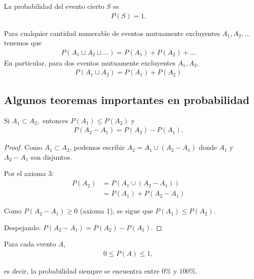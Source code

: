 \begin{axioma}
	La probabilidad del evento cierto $S$ es
	\begin{align}
		\label{eq:2.2.2}
		P(S)=1.
	\end{align}
\end{axioma}



\begin{axioma}
	Para cualquier cantidad numerable de eventos mutuamente excluyentes
	$A_{1},A_{2},...$ tenemos que
	\begin{align}
		\label{eq:2.2.3}
		P(A_{1}\sqcup A_{2} \sqcup ...)=P(A_{1})+P(A_{2})+...
	\end{align}
	En particular, para dos eventos mutuamente excluyentes $A_{1},A_{2},$
	\begin{align}
		\label{eq:2.2.4}
		P(A_{1}\sqcup A_{2})=P(A_{1})+P(A_{2})
	\end{align}
	
\end{axioma}


\subsection{Algunos teoremas importantes en probabilidad}

\begin{teorema}
	\label{thm:2.2.1}
	Si $A_{1}\subset A_{2},$ entonces $P(A_{1})\leq P(A_{2})$ y
	\begin{align}
		P(A_{2}-A_{1})=P(A_{2})-P(A_{1}).
	\end{align}
\end{teorema}

\begin{proof}
	Como $A_1 \subset A_2$, podemos escribir $A_2 = A_1 \cup (A_2 - A_1)$ donde $A_1$ y $A_2 - A_1$ son disjuntos.
	
	Por el axioma 3:
	\begin{align}
		P(A_2) &= P(A_1 \cup (A_2 - A_1)) \\
		&= P(A_1) + P(A_2 - A_1)
	\end{align}
	
	Como $P(A_2 - A_1) \geq 0$ (axioma 1), se sigue que $P(A_1) \leq P(A_2)$.
	
	Despejando: $P(A_2 - A_1) = P(A_2) - P(A_1)$.
\end{proof}


\begin{teorema}
	\label{thm:2.2.2}
	Para cada evento $A$,
	\begin{align}
		\label{eq:2.2.5}
		0\leq P(A) \leq 1,
	\end{align}
	
	es decir, la probabilidad siempre se encuentra entre $0\%$ y $100\%.$
\end{teorema}

